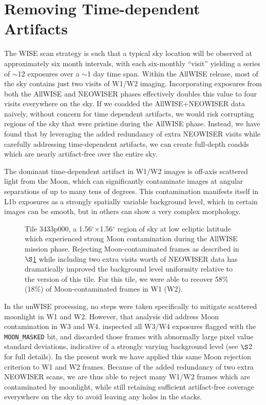 \documentclass{emulateapj}
\begin{document}
\section{Removing Time-dependent Artifacts}
\label{sec:moon}

The WISE scan strategy is such that a typical sky location will be 
observed at approximately six month intervals, with each six-monthly
``visit'' yielding a series of $\sim$12 exposures over a $\sim$1
day time span. Within the AllWISE release, most of the sky contains just two 
visits
of W1/W2 imaging. Incorporating exposures from both the AllWISE and
NEOWISER phases effectively doubles this value to four visits everywhere
on the sky. If we coadded the AllWISE+NEOWISER data naively, without
concern for time dependent artifacts, we would risk corrupting regions of the 
sky that were pristine during the AllWISE phase. Instead, we have found that by 
leveraging the added redundancy of extra NEOWISER visits while carefully 
addressing time-dependent artifacts, we can create full-depth coadds which are 
nearly artifact-free over the entire sky.

The dominant time-dependent artifact in W1/W2 images is off-axis
scattered light from the Moon, which can significantly contaminate
images at angular separations of up to many tens of degrees. This
contamination manifests itself in L1b exposures as a strongly spatially 
variable background level, which in certain images can be smooth, but in
others can show a very complex morphology.

\begin{figure*} [ht]
 \begin{center}
  \caption{\label{fig:moon_3433p000} Tile 3433p000, a 
           1.56$^{\circ}$$\times$1.56$^{\circ}$ region of sky at low
           ecliptic latitude which experienced strong Moon contamination 
           during the AllWISE mission phase. Rejecting Moon-contaminated
           frames as described in $\S$\ref{sec:moon} while including
           two extra visits worth of NEOWISER data has dramatically
           improved the background level uniformity relative to the
           \cite{lang14} version of this tile. For this tile, we were
           able to recover 58\% (18\%) of Moon-contaminated frames in W1 (W2).}
 \end{center}
\end{figure*}

In the \cite{lang14} unWISE processing, no steps were taken specifically
to mitigate scattered moonlight in W1 and W2. However, that analysis did 
address Moon contamination in W3 and W4. \cite{lang14}
inspected all W3/W4 exposures flagged with the \verb|MOON_MASKED| bit, and 
discarded those frames with abnormally large pixel value standard deviations,
indicative of a strongly varying background level (see \citealt{lang14} $\S$2
for full details). In the present work we have applied this same
Moon rejection criterion to W1 and W2 frames. Because of the added redundancy
of two extra NEOWISER scans, we are thus able to reject many W1/W2
frames which are contaminated by moonlight, while still retaining 
sufficient artifact-free coverage everywhere on the sky to avoid leaving
any holes in the stacks.
\end{document}
